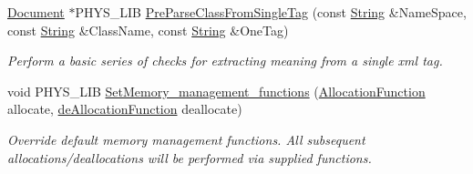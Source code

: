 \begin{DoxyCompactItemize}
\hyperlink{classphys_1_1xml_1_1Document}{Document} $\ast$PHYS\_\-LIB \hyperlink{namespacephys_1_1xml_ab5e51b3ea3a6e61bf4c8368005232210}{PreParseClassFromSingleTag} (const \hyperlink{namespacephys_1_1xml_a4d8ca7638328d16d303e5a4c849f4704}{String} \&NameSpace, const \hyperlink{namespacephys_1_1xml_a4d8ca7638328d16d303e5a4c849f4704}{String} \&ClassName, const \hyperlink{namespacephys_1_1xml_a4d8ca7638328d16d303e5a4c849f4704}{String} \&OneTag)
\begin{DoxyCompactList}\small\item\em Perform a basic series of checks for extracting meaning from a single xml tag. \item\end{DoxyCompactList}\item 
void PHYS\_\-LIB \hyperlink{namespacephys_1_1xml_a2ad88e4331ac29a86c99d5e40b31f983}{SetMemory\_\-management\_\-functions} (\hyperlink{namespacephys_1_1xml_a6d772c4cf52d017d4d6ad68ddcbd493f}{AllocationFunction} allocate, \hyperlink{namespacephys_1_1xml_af98b1cb6640aa712180aad89a1c776d8}{deAllocationFunction} deallocate)
\begin{DoxyCompactList}\small\item\em Override default memory management functions. All subsequent allocations/deallocations will be performed via supplied functions. \item\end{DoxyCompactList}\end{DoxyCompactItemize}
